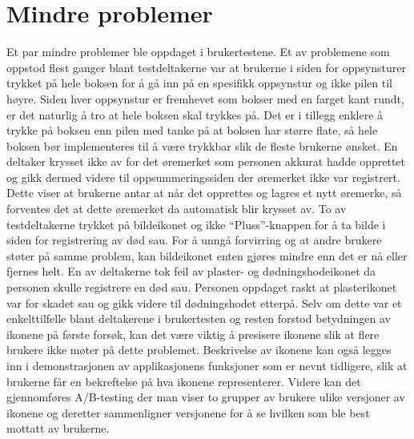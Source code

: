 \section{Mindre problemer}
Et par mindre problemer ble oppdaget i brukertestene. Et av problemene som oppstod flest ganger blant testdeltakerne var at brukerne i siden for oppsynsturer trykket på hele boksen for å gå inn på en spesifikk oppsynstur og ikke pilen til høyre. Siden hver oppsynstur er fremhevet som bokser med en farget kant rundt, er det naturlig å tro at hele boksen skal trykkes på. Det er i tillegg enklere å trykke på boksen enn pilen med tanke på at boksen har større flate, så hele boksen bør implementeres til å være trykkbar slik de fleste brukerne ønsket. 
\newline
\newline
En deltaker krysset ikke av for det øremerket som personen akkurat hadde opprettet og gikk dermed videre til oppsummeringssiden der øremerket ikke var registrert. Dette viser at brukerne antar at når det opprettes og lagres et nytt øremerke, så forventes det at dette øremerket da automatisk blir krysset av. 
To av testdeltakerne trykket på bildeikonet og ikke \enquote{Pluss}-knappen for å ta bilde i siden for registrering av død sau. For å unngå forvirring og at andre brukere støter på samme problem, kan bildeikonet enten gjøres mindre enn det er nå eller fjernes helt.  
\newline
\newline
En av deltakerne tok feil av plaster- og dødningshodeikonet da personen skulle registrere en død sau. Personen oppdaget raskt at plasterikonet var for skadet sau og gikk videre til dødningshodet etterpå. Selv om dette var et enkelttilfelle blant deltakerene i brukertesten og resten forstod betydningen av ikonene på første forsøk, kan det være viktig å presisere ikonene slik at flere brukere ikke møter på dette problemet. Beskrivelse av ikonene kan også legges inn i demonstrasjonen av applikasjonens funksjoner som er nevnt tidligere, slik at brukerne får en bekreftelse på hva ikonene representerer. Videre kan det gjennomføres A/B-testing der man viser to grupper av brukere ulike versjoner av ikonene og deretter sammenligner versjonene for å se hvilken som ble best mottatt av brukerne. 